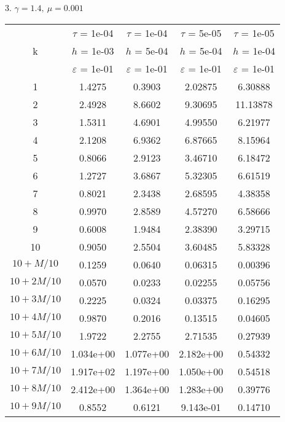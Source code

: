 3. $\gamma = 1.4, \ \mu = 0.001$
\begin{center}
	\begin{tabular}{ |c|c|c|c|c| } 
		\hline
		& $\tau$ = 1e-04 & $\tau$ = 1e-04 & $\tau$ = 5e-05 & $\tau$ = 1e-05 \\ 
		k & $h$ = 1e-03 & $h$ = 5e-04 & $h$ = 5e-04 & $h$ = 1e-04 \\ 
		& $\varepsilon$ = 1e-01 & $\varepsilon$ = 1e-01 & $\varepsilon$ = 1e-01 & $\varepsilon$ = 1e-01 \\ 
		\hline
		1 & 1.4275 & 0.3903 & 2.02875 & 6.30888 \\
		\hline
		2 & 2.4928 & 8.6602 & 9.30695 & 11.13878 \\
		\hline
		3 & 1.5311 & 4.6901 & 4.99550 & 6.21977 \\
		\hline
		4 & 2.1208 & 6.9362 & 6.87665 & 8.15964 \\
		\hline
		5 & 0.8066 & 2.9123 & 3.46710 & 6.18472 \\
		\hline
		6 & 1.2727 & 3.6867 & 5.32305 & 6.61519 \\
		\hline
		7 & 0.8021 & 2.3438 & 2.68595 & 4.38358 \\
		\hline
		8 & 0.9970 & 2.8589 & 4.57270 & 6.58666 \\
		\hline
		9 & 0.6008 & 1.9484 & 2.38390 & 3.29715 \\
		\hline
		10 & 0.9050 & 2.5504 & 3.60485 & 5.83328 \\
		\hline
		$10 + M/10$ & 0.1259 & 0.0640 & 0.06315 & 0.00396 \\
		\hline
		$10 + 2M/10$ & 0.0570 & 0.0233 & 0.02255 & 0.05756 \\
		\hline
		$10 + 3M/10$ & 0.2225 & 0.0324 & 0.03375 & 0.16295 \\
		\hline
		$10 + 4M/10$ & 0.9870 & 0.2016 & 0.13515 & 0.04605 \\
		\hline
		$10 + 5M/10$ & 1.9722 & 2.2755 & 2.71535 & 0.27939 \\
		\hline
		$10 + 6M/10$ & 1.034e+00 & 1.077e+00 & 2.182e+00 & 0.54332 \\
		\hline
		$10 + 7M/10$ & 1.917e+02 & 1.197e+00 & 1.050e+00 & 0.54518 \\
		\hline
		$10 + 8M/10$ & 2.412e+00 & 1.364e+00 & 1.283e+00 & 0.39776 \\
		\hline
		$10 + 9M/10$ & 0.8552 & 0.6121 & 9.143e-01 & 0.14710 \\
		\hline
	\end{tabular}
\end{center}

